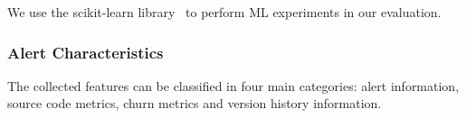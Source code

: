 We use the scikit-learn library~\cite{scikit-learn} to perform ML experiments in our evaluation.

\subsubsection{Alert Characteristics}

The collected features can be classified in four main categories: alert information, source code metrics, churn metrics and version history information.

%
%
%
%
%

